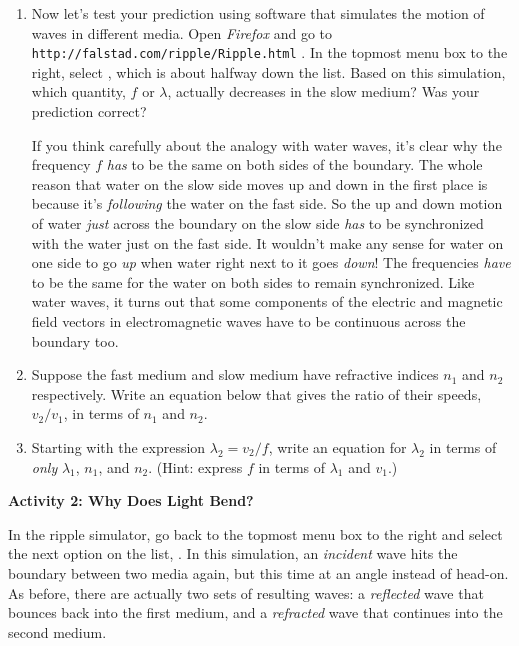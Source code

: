 \begin{enumerate}[labparts]
\newpage
\item Now let's test your prediction using software that simulates the motion of waves in different media.  Open \textit{Firefox} and go to \verb!http://falstad.com/ripple/Ripple.html! .  In the topmost menu box to the right, select , which is about halfway down the list.  Based on this simulation, which quantity, $f$ or $\lambda$, actually decreases in the slow medium?  Was your prediction correct?
\answerspace{0.6in}

If you think carefully about the analogy with water waves, it's clear why the frequency $f$ \textit{has} to be the same on both sides of the boundary.  The whole reason that water on the slow side moves up and down in the first place is because it's \textit{following} the water on the fast side.  So the up and down motion of water \textit{just} across the boundary on the slow side \textit{has} to be synchronized with the water just on the fast side.  It wouldn't make any sense for water on one side to go \textit{up} when water right next to it goes \textit{down}!  The frequencies \textit{have} to be the same for the water on both sides to remain synchronized.  Like water waves, it turns out that some components of the electric and magnetic field vectors in electromagnetic waves have to be continuous across the boundary too.

\item Suppose the fast medium and slow medium have  refractive indices $n_1$ and $n_2$ respectively.  Write an equation below that gives the ratio of their speeds, $v_2/v_1$, in terms of $n_1$ and $n_2$.
\answerspace{0.5in}

\item Starting with the expression $\lambda_2=v_2/f$, write an equation for $\lambda_2$ in terms of \textit{only} $\lambda_1$, $n_1$, and $n_2$.  (Hint: express $f$ in terms of $\lambda_1$ and $v_1$.) \label{part_ratio_of_lambdas}
\answerspace{1.0in}

\end{enumerate}
\textbf{Activity 2: Why Does Light Bend?}

In the ripple simulator, go back to the topmost menu box to the right and select the next option on the list, .  In this simulation, an \textit{incident} wave hits the boundary between two media again, but this time at an angle instead of head-on.  As before, there are actually two sets of resulting waves: a \textit{reflected} wave that bounces back into the first medium, and a \textit{refracted} wave that continues into the second medium. 

